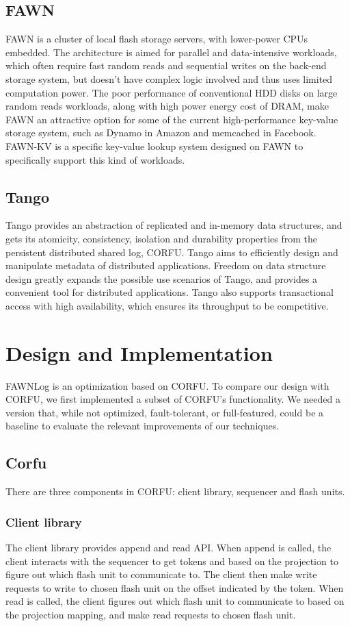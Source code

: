 \documentclass[letterpaper,twocolumn,10pt]{article}
\begin{document}
\subsection{FAWN}
FAWN\cite{fawn} is a cluster of local flash storage servers, with lower-power CPUs embedded. The architecture is aimed for parallel and data-intensive workloads, which often require fast random reads and sequential writes on the back-end storage system, but doesn't have complex logic involved and thus uses limited computation power. The poor performance of conventional HDD disks on large random reads workloads, along with high power energy cost of DRAM, make FAWN an attractive option for some of the current high-performance key-value storage system, such as Dynamo\cite{dynamo} in Amazon and memcached\cite{memcached} in Facebook. FAWN-KV\cite{fawn} is a specific key-value lookup system designed on FAWN to specifically support this kind of workloads.

\subsection{Tango}
Tango\cite{tango} provides an abstraction of replicated and in-memory data structures, and gets its atomicity, consistency, isolation and durability properties from the persistent distributed shared log, CORFU. Tango aims to efficiently design and manipulate metadata of distributed applications. Freedom on data structure design greatly expands the possible use scenarios of Tango, and provides a convenient tool for distributed applications. Tango also supports transactional access with high availability, which ensures its throughput to be competitive.

\section{Design and Implementation}
FAWNLog is an optimization based on CORFU\cite{corfu}. To compare our design with CORFU, we first implemented a subset of CORFU’s functionality. We needed a version that, while not optimized, fault-tolerant, or full-featured, could be a baseline to evaluate the relevant improvements of our techniques.

\subsection{Corfu}
There are three components in CORFU: client library, sequencer and flash units.

\subsubsection{Client library}
The client library provides append and read API. When append is called, the client interacts with the sequencer to get tokens and based on the projection to figure out which flash unit to communicate to. The client then make write requests to write to chosen flash unit on the offset indicated by the token. When read is called, the client figures out which flash unit to communicate to based on the projection mapping, and make read requests to chosen flash unit.
\end{document}
